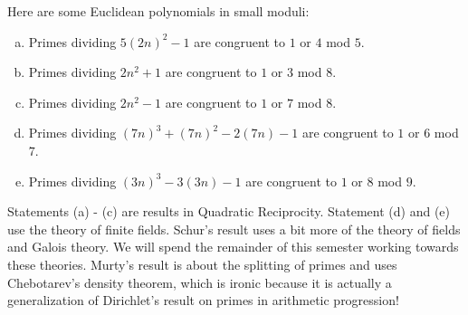 \documentclass{article}
\begin{document}
Here are some Euclidean polynomials in small moduli:
\begin{enumerate}[(a)]
    \item Primes dividing $5(2n)^2 - 1$ are congruent to $1$ or $4$ mod $5$. 
    \item Primes dividing $2n^2+1$ are congruent to $1$ or $3$ mod $8$. 
    \item Primes dividing $2n^2-1$ are congruent to $1$ or $7$ mod $8$.
    \item Primes dividing $(7n)^3 + (7n)^2 - 2(7n) - 1$ are congruent to $1$ or $6$ mod $7$.
    \item Primes dividing $(3n)^3 - 3(3n) - 1$ are congruent to $1$ or $8$ mod $9$.
\end{enumerate}
Statements (a) - (c) are results in Quadratic Reciprocity. Statement (d) and (e) use the theory of finite fields. Schur's result uses a bit more of the theory of fields and Galois theory. We will spend the remainder of this semester working towards these theories. Murty's result is about the splitting of primes and uses Chebotarev's density theorem, which is ironic because it is actually a generalization of Dirichlet's result on primes in arithmetic progression! %
\end{document}
